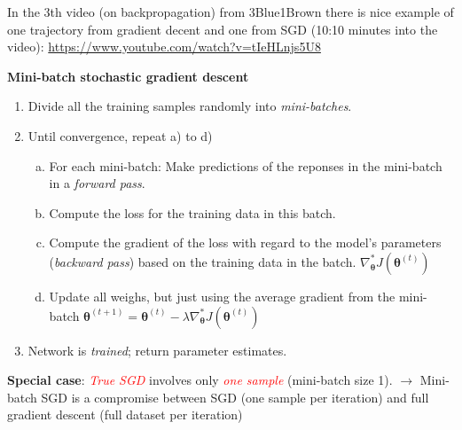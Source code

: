 \documentclass[10pt,ignorenonframetext,]{beamer}
\providecommand{\tightlist}{%
  \setlength{\itemsep}{0pt}\setlength{\parskip}{0pt}}
\begin{document}
\begin{frame}

In the 3th video (on backpropagation) from 3Blue1Brown there is nice
example of one trajectory from gradient decent and one from SGD (10:10
minutes into the video):
\url{https://www.youtube.com/watch?v=tIeHLnjs5U8}

\end{frame}

\begin{frame}

\textbf{Mini-batch stochastic gradient descent}

\vspace{1mm}

\begin{enumerate}
\tightlist
\item
  Divide all the training samples randomly into \emph{mini-batches}.
\end{enumerate}

\vspace{1mm}

\begin{enumerate}
\setcounter{enumi}{1}
\tightlist
\item
  Until convergence, repeat a) to d)

  \begin{enumerate}
  [a)]
  \tightlist
  \item
    For each mini-batch: Make predictions of the reponses in the
    mini-batch in a \emph{forward pass}.
  \item
    Compute the loss for the training data in this batch.
  \item
    Compute the gradient of the loss with regard to the model's
    parameters (\emph{backward pass}) based on the training data in the
    batch.
    \(\nabla_{\boldsymbol \theta}^* J({\boldsymbol \theta}^{(t)})\)
  \item
    Update all weighs, but just using the average gradient from the
    mini-batch
    \({\boldsymbol \theta}^{(t+1)}={\boldsymbol \theta}^{(t)} - \lambda \nabla_{\boldsymbol \theta} ^* J({\boldsymbol \theta}^{(t)})\)
  \end{enumerate}
\end{enumerate}

\vspace{1mm}

\begin{enumerate}
\setcounter{enumi}{2}
\tightlist
\item
  Network is \emph{trained}; return parameter estimates.
\end{enumerate}

\vspace{6mm}

\textbf{Special case}: \emph{\textcolor{red}{True SGD}} involves only
\emph{\textcolor{red}{one sample}} (mini-batch size 1). \(\rightarrow\)
Mini-batch SGD is a compromise between SGD (one sample per iteration)
and full gradient descent (full dataset per iteration)

\end{frame}
\end{document}
